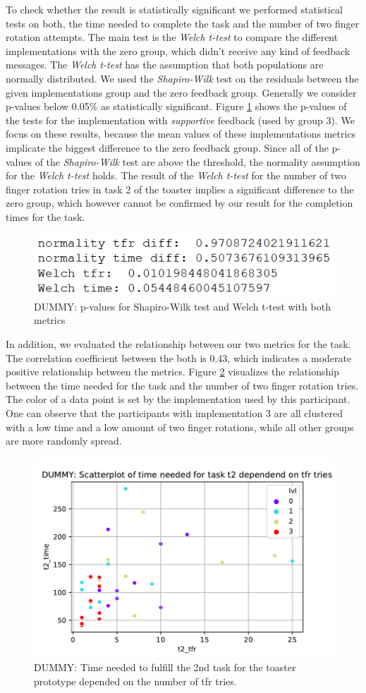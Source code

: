 \documentclass[11pt, a4paper]{article}
\begin{document}
			To check whether the result is statistically significant we performed statistical tests on both, the time needed to complete the task and the number of two finger rotation attempts. The main test is the \emph{Welch t-test} to compare the different implementations with the zero group, which didn't receive any kind of feedback messages. The \emph{Welch t-test} has the assumption that both populations are normally distributed. We used the \emph{Shapiro-Wilk} test on the residuals between the given implementations group and the zero feedback group. Generally we consider p-values below 0.05\% as statistically significant. Figure \ref{fig:stats} shows the p-values of the tests for the implementation with \emph{supportive} feedback (used by group 3). We focus on these results, because the mean values of these implementations metrics implicate the biggest difference to the zero feedback group. Since all of the p-values of the \emph{Shapiro-Wilk} test are above the threshold, the normality assumption for the \emph{Welch t-test} holds. The result of the \emph{Welch t-test} for the number of two finger rotation tries in task 2 of the toaster implies a significant difference to the zero group, which however cannot be confirmed by our result for the completion times for the task.

			\begin{figure}[H]
				\centering
				\includegraphics[width=.49\textwidth]{img/stats_table_dummy.png}
				\caption{DUMMY: p-values for Shapiro-Wilk test and Welch t-test with both metrics}
				\label{fig:stats}
			\end{figure}

			In addition, we evaluated the relationship between our two metrics for the task. The correlation coefficient between the both is 0.43, which indicates a moderate positive relationship between the metrics. Figure \ref{fig:scatter} visualizes the relationship between the time needed for the task and the number of two finger rotation tries. The color of a data point is set by the implementation used by this participant. One can observe that the participants with implementation 3 are all clustered with a low time and a low amount of two finger rotations, while all other groups are more randomly spread.

			\begin{figure}[H]
				\centering
				\includegraphics[width=.49\textwidth]{img/plot/plot_scatter.pdf}
				\caption{DUMMY: Time needed to fulfill the 2nd task for the toaster prototype depended on the number of tfr tries.}
				\label{fig:scatter}
			\end{figure}
\end{document}
